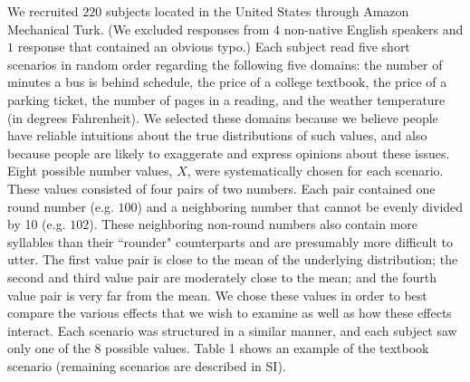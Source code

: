 \documentclass{article} %
\begin{document}
We recruited $220$ subjects located in the United States through Amazon Mechanical Turk. (We excluded responses from $4$ non-native English speakers and $1$ response that contained an obvious typo.) Each subject read five short scenarios in random order regarding the following five domains: the number of minutes a bus is behind schedule, the price of a college textbook, the price of a parking ticket, the number of pages in a reading, and the weather temperature (in degrees Fahrenheit). We selected these domains because we believe people have reliable intuitions about the true distributions of such values, and also because people are likely to exaggerate and express opinions about these issues. Eight possible number values, $X$, were systematically chosen for each scenario. These values consisted of four pairs of two numbers. Each pair contained one round number (e.g. $100$) and a neighboring number that cannot be evenly divided by 10 (e.g. $102$). These neighboring non-round numbers also contain more syllables than their ``rounder" counterparts and are presumably more difficult to utter. The first value pair is close to the mean of the underlying distribution; the second and third value pair are moderately close to the mean; and the fourth value pair is very far from the mean. We chose these values in order to best compare the various effects that we wish to examine as well as how these effects interact. Each scenario was structured in a similar manner, and each subject saw only one of the $8$ possible values. Table 1 shows an example of the textbook scenario (remaining  scenarios are described in SI).
\end{document}
